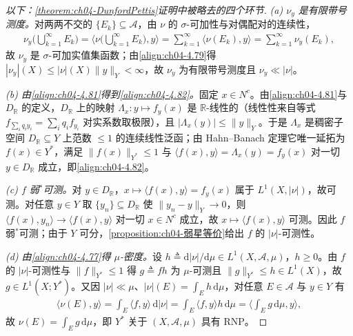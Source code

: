 \documentclass[../../main.tex]{subfiles}%
\begin{document}
\begin{proof}[以下：\cref{theorem:ch04-DunfordPettis}证明中被略去的四个环节]
\emph{(a) $\nu_y$ 是有限带号测度。}对两两不交的 $\{E_k\}\subseteq\mathcal{A}$，由 $\nu$ 的 $\sigma$-可加性与对偶配对的连续性，
\begin{align*}
\nu_y\Big(\bigcup_{k=1}^\infty E_k\Big)=\Big\langle\nu\Big(\bigcup_{k=1}^\infty E_k\Big),y\Big\rangle=\sum_{k=1}^\infty\langle\nu(E_k),y\rangle=\sum_{k=1}^\infty\nu_y(E_k),
\end{align*}
故 $\nu_y$ 是 $\sigma$-可加实值集函数；由\eqref{align:ch04-4.79}得 $|\nu_y|(X)\leqslant|\nu|(X)\|y\|_Y<\infty$，故 $\nu_y$ 为有限带号测度且 $\nu_y\ll|\nu|$。

\emph{(b) 由\eqref{align:ch04-4.81}得到\eqref{align:ch04-4.82}。}固定 $x\in N^c$。由\eqref{align:ch04-4.81}与 $D_{\mathbb R}$ 的定义，$D_{\mathbb R}$ 上的映射 $\Lambda_x:y\mapsto f_y(x)$ 是 $\mathbb{R}$-线性的（线性性来自等式 $f_{\sum_iq_iy_i}=\sum_iq_if_{y_i}$ 对实系数取极限），且 $|\Lambda_x(y)|\leqslant\|y\|_Y$。于是 $\Lambda_x$ 是稠密子空间 $D_{\mathbb R}\subseteq Y$ 上范数 $\leqslant1$ 的连续线性泛函；由 Hahn--Banach 定理它唯一延拓为 $f(x)\in Y^*$，满足 $\|f(x)\|_{Y^*}\leqslant1$ 与 $\langle f(x),y\rangle=\Lambda_x(y)=f_y(x)$ 对一切 $y\in D_{\mathbb R}$ 成立，即\eqref{align:ch04-4.82}。

\emph{(c) $f$ 弱$^*$可测。}对 $y\in D_{\mathbb R}$，$x\mapsto\langle f(x),y\rangle=f_y(x)$ 属于 $L^1(X,|\nu|)$，故可测。对任意 $y\in Y$ 取 $\{y_n\}\subseteq D_{\mathbb R}$ 使 $\|y_n-y\|_Y\to0$，则 $\langle f(x),y_n\rangle\to\langle f(x),y\rangle$ 对一切 $x\in N^c$ 成立，故 $x\mapsto\langle f(x),y\rangle$ 可测。因此 $f$ 弱$^*$可测；由于 $Y$ 可分，\cref{proposition:ch04-弱星等价}给出 $f$ 的 $|\nu|$-可测性。

\emph{(d) 由\eqref{align:ch04-4.77}得 $\mu$-密度。}设 $h\triangleq\mathrm{d}|\nu|/\mathrm{d}\mu\in L^1(X,\mathcal{A},\mu)$，$h\geqslant0$。由 $f$ 的 $|\nu|$-可测性与 $\|f\|_{Y^*}\leqslant1$ 得 $g\triangleq fh$ 为 $\mu$-可测且 $\|g\|_{Y^*}\leqslant h\in L^1(X)$，故 $g\in L^1(X;Y^*)$。又因 $|\nu|\ll\mu$、$|\nu|(E)=\int_Eh\,\mathrm{d}\mu$，对任意 $E\in\mathcal{A}$ 与 $y\in Y$ 有
\begin{align*}
\langle\nu(E),y\rangle=\int_E\langle f,y\rangle\,\mathrm{d}|\nu|=\int_E\langle f,y\rangle h\,\mathrm{d}\mu=\Big\langle\int_E g\,\mathrm{d}\mu,y\Big\rangle,
\end{align*}
故 $\nu(E)=\int_E g\,\mathrm{d}\mu$，即 $Y^*$ 关于 $(X,\mathcal{A},\mu)$ 具有 RNP。
\end{proof}
\end{document}
